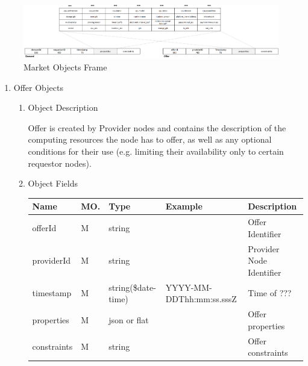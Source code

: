 \begin{figure}[htbp]
    \centering
    \includegraphics[width=14cm,angle=0]{./diag/Reference/MarketFrame-2-Reference.png}
	\caption{Market Objects Frame}
    \label{fig:MF2}
\end{figure}

\begin{enumerate}

\item Offer Objects

\begin{enumerate}

\item Object Description

Offer is created by Provider nodes and contains the description of the
computing resources the node has to offer, as well as any optional conditions
for their use (e.g. limiting their availability only to certain requestor nodes).

\item Object Fields

\begin{center}
\begin{tabular}{|p{3cm}|l|p{3cm}|p{3cm}|p{4cm}|} 
\hline
\rowcolor{lightgray}	Name	& MO.	& Type	& Example & 	Description \\
\hline

offerId 	& M & string & 		& Offer Identifier \\
\hline 		

providerId & M & string  & 		& Provider Node Identifier \\
\hline

timestamp	& M	& 	string(\$date-time)	& YYYY-MM-DDThh:mm:ss.sssZ	&	Time of ???  \\
\hline

properties	& M	& 	json or flat	&		&	Offer properties \\ 
\hline

constraints	& M	& 	string	&		&	Offer constraints \\ 
\hline

\end{tabular}
\end{center}


\end{enumerate}
\end{enumerate}
